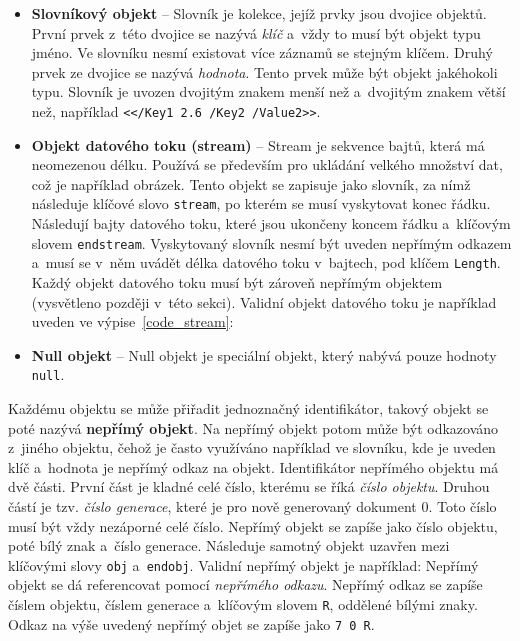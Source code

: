 \begin{itemize}
    \item \textbf{Slovníkový objekt} -- Slovník je kolekce, jejíž prvky jsou
    dvojice objektů. První prvek z~této dvojice se nazývá \emph{klíč} a~vždy to 
    musí být objekt typu jméno. Ve slovníku nesmí existovat více záznamů se
    stejným klíčem. Druhý prvek ze dvojice se nazývá \emph{hodnota}.
    Tento prvek může být objekt jakéhokoli typu. Slovník je uvozen dvojitým znakem
    menší než a~dvojitým znakem větší než, například
    \texttt{<</Key1 2.6 /Key2 /Value2>>}.

    \item \textbf{Objekt datového toku (stream)} -- Stream je sekvence bajtů, 
    která má neomezenou délku. Používá se především pro ukládání velkého množství
    dat, což je například obrázek. Tento objekt se zapisuje jako slovník, za nímž
    následuje klíčové slovo \texttt{stream}, po kterém se musí vyskytovat konec
    řádku. Následují bajty datového toku, které jsou ukončeny koncem řádku
    a~klíčovým slovem \texttt{endstream}. Vyskytovaný slovník nesmí být uveden
    nepřímým odkazem a~musí se v~něm uvádět délka datového toku v~bajtech, pod
    klíčem \texttt{Length}. Každý objekt datového toku musí být zároveň nepřímým
    objektem (vysvětleno později v~této sekci). Validní objekt datového toku je
    například uveden ve výpise~\ref{code_stream}:

    \item \textbf{Null objekt} -- Null objekt je speciální objekt, který nabývá
    pouze hodnoty \texttt{null}.
\end{itemize}

Každému objektu se může přiřadit jednoznačný identifikátor, takový objekt se poté
nazývá \textbf{nepřímý objekt}. Na nepřímý objekt potom může být odkazováno
z~jiného objektu, čehož je často využíváno například ve slovníku, kde je uveden
klíč a~hodnota je nepřímý odkaz na objekt. Identifikátor nepřímého objektu má dvě
části. První část je kladné celé číslo, kterému se říká \emph{číslo objektu}.
Druhou částí je tzv. \emph{číslo generace}, které je pro nově generovaný dokument
0. Toto číslo musí být vždy nezáporné celé číslo. Nepřímý objekt se zapíše jako
číslo objektu, poté bílý znak a~číslo generace. Následuje samotný objekt uzavřen
mezi klíčovými slovy \texttt{obj} a~\texttt{endobj}. Validní nepřímý objekt je
například:
\noindent Nepřímý objekt se dá referencovat pomocí \emph{nepřímého odkazu}.
Nepřímý odkaz se zapíše číslem objektu, číslem generace a~klíčovým slovem
\texttt{R}, oddělené bílými znaky. Odkaz na výše uvedený nepřímý objet se zapíše
jako \texttt{7 0 R}.


